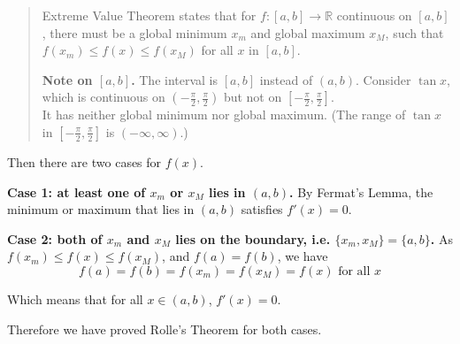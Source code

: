\documentclass{article}
\begin{document}
\begin{quote}
    Extreme Value Theorem states that for $f: [a, b] \to \mathbb{R}$ continuous on $[a, b]$, there must be a global minimum $x_m$ and global maximum $x_M$, such that $f(x_m) \leq f(x) \leq f(x_M)$ for all $x$ in $[a, b]$.
    
    \textbf{Note on $[a, b]$.} The interval is $[a, b]$ instead of $(a, b)$. Consider $\tan x$, which is continuous on $(-\frac{\pi}{2}, \frac{\pi}{2})$ but not on $[-\frac{\pi}{2}, \frac{\pi}{2}]$.\\
    It has neither global minimum nor global maximum. (The range of $\tan x$ in $[-\frac{\pi}{2}, \frac{\pi}{2}]$ is $(-\infty, \infty)$.)
\end{quote}

Then there are two cases for $f(x)$.

\textbf{Case 1: at least one of $x_m$ or $x_M$ lies in $(a, b)$.}
By Fermat's Lemma, the minimum or maximum that lies in $(a, b)$ satisfies $f'(x) = 0$.

\textbf{Case 2: both of $x_m$ and $x_M$ lies on the boundary, i.e. $\{x_m, x_M\} = \{a, b\}$.}
As $f(x_m) \leq f(x) \leq f(x_M)$, and $f(a) = f(b)$, we have
$$ f(a) = f(b) = f(x_m) = f(x_M) = f(x) \text{ for all } x $$

Which means that for all $x \in (a, b)$, $f'(x) = 0$.

Therefore we have proved Rolle's Theorem for both cases.
\end{document}

